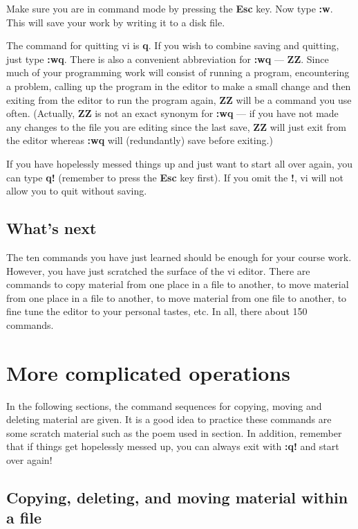 Make sure you are in command mode by pressing the {\bf Esc} key. Now
type {\bf :w}. This will save your work by writing it to a disk file.

The command for quitting vi is {\bf q}. If you wish to combine saving 
and quitting, just type {\bf :wq}. There is also a convenient abbreviation 
for {\bf :wq} --- {\bf ZZ}. Since much of your programming work will consist of 
running a program, encountering a problem, calling up the program in 
the editor to make a small change and then exiting from the editor to 
run the program again, {\bf ZZ} will be a command you use often. (Actually,
{\bf ZZ} is not an exact synonym for {\bf :wq} --- if you have not made any changes
to the file you are editing since the last save, {\bf ZZ} will just exit
from the editor whereas {\bf :wq} will (redundantly) save before exiting.)

If you have hopelessly messed things up and just want to start 
all over again, you can type {\bf q!} (remember to press the {\bf Esc} 
key first). If you omit the {\bf !}, vi will not allow you to quit 
without saving.

\subsection{What's next}

The ten commands you have just learned should be enough for your 
course work. However, you have just scratched the surface of 
the vi editor. There are commands to copy material from 
one place in a file to another, to move material from one place 
in a file to another, to move material from one file to another, 
to fine tune the editor to your personal tastes, etc. In all, 
there about 150 commands. 

\section{More complicated operations}

In the following sections, the command sequences for copying, moving and
deleting material are given. It is a good idea to practice these commands
are some scratch material such as the poem used in section. In addition,
remember that if things get hopelessly messed up, you can always exit with
{\bf :q!} and start over again!

\subsection{Copying, deleting, and moving material within a file}

